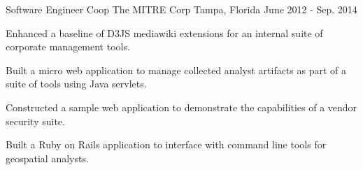 \begin{cventries}
  \cventry
    {Software Engineer Coop} %
    {The MITRE Corp} %
    {Tampa, Florida} %
    {June 2012 - Sep. 2014} %
    {
      \begin{cvitems} %
        \item {Enhanced a baseline of D3JS mediawiki extensions for an internal suite of corporate management tools.}
        \item {Built a micro web application to manage collected analyst artifacts as part of a suite of tools using Java servlets.}
        \item {Constructed a sample web application to demonstrate the capabilities of a vendor security suite.}
        \item {Built a Ruby on Rails application to interface with command line tools for geospatial analysts.}
      \end{cvitems}
    }

\end{cventries}
